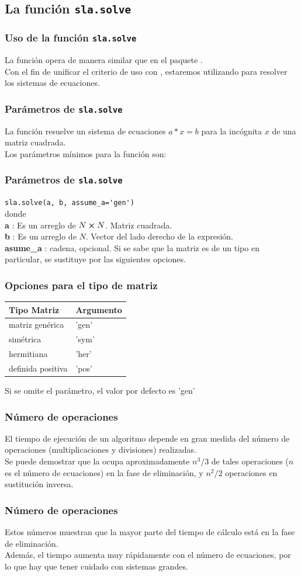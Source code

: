 \subsection{La función \texttt{sla.solve}}
\begin{frame}
\frametitle{Uso de la función \texttt{sla.solve}}
La función  opera de manera similar que en el paquete .
\\
\bigskip
Con el fin de unificar el criterio de uso con \python, estaremos utilizando  para resolver los sistemas de ecuaciones. 
\end{frame}
\begin{frame}
\frametitle{Parámetros de \texttt{sla.solve}}
La función  resuelve un sistema de ecuaciones $a * x = b$ para la incógnita $x$ de una matriz cuadrada.
\\
\bigskip
Los parámetros mínimos para la función  son:
\end{frame}
\begin{frame}[fragile]
\frametitle{Parámetros de \texttt{sla.solve}}
\verb|sla.solve(a, b, assume_a='gen')|
\\
\medskip
donde
\\
\textbf{a} : Es un arreglo de $N \cp N$. Matriz cuadrada.
\\
\textbf{b} : Es un arreglo de $N$. Vector del lado derecho de la expresión.
\\
\textbf{asume\_a} : cadena, opcional. Si se sabe que la matriz es de un tipo en particular, se 
sustituye por las siguientes opciones.
\end{frame}
\begin{frame}
\frametitle{Opciones para el tipo de matriz}
\begin{table}
\begin{tabular}{l l}
Tipo Matriz & Argumento \\ \hline
matriz genérica & 'gen' \\
simétrica & 'sym' \\
hermitiana & 'her' \\
definida positiva & 'pos'
\end{tabular}
\end{table}
Si se omite el parámetro, el valor por defecto es 'gen'
\end{frame}
\begin{frame}
\frametitle{Número de operaciones}
El tiempo de ejecución de un algoritmo depende en gran medida del número de operaciones  (multiplicaciones y divisiones) realizadas.
\\
\bigskip
Se puede demostrar que la  ocupa aproximadamente $n^{3}/3$ de tales operaciones ($n$ es el número de ecuaciones) en la fase de eliminación, y $n^{2}/2$ operaciones en sustitución inversa.
\end{frame}
\begin{frame}
\frametitle{Número de operaciones}
Estos números muestran que la mayor parte del tiempo de cálculo está en la fase de eliminación.
\\
\bigskip
Además, el tiempo aumenta muy rápidamente con el número de ecuaciones, por lo que hay que tener cuidado con sistemas grandes.
\end{frame}
